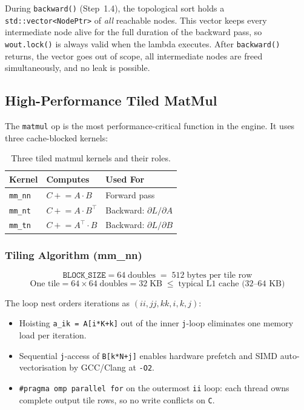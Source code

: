 \documentclass[12pt, a4paper]{article}
\begin{document}
\begin{tcolorbox}[interviewbox, title={Interview Talking Point - Why is weak\_ptr safe here?}]
  During \texttt{backward()} (Step~1.4), the topological sort holds a
  \texttt{std::vector<NodePtr>} of \emph{all} reachable nodes.  This vector
  keeps every intermediate node alive for the full duration of the backward
  pass, so \texttt{wout.lock()} is always valid when the lambda executes.
  After \texttt{backward()} returns, the vector goes out of scope, all
  intermediate nodes are freed simultaneously, and no leak is possible.
\end{tcolorbox}

\subsection{High-Performance Tiled MatMul}

The \texttt{matmul} op is the most performance-critical function in the engine.
It uses three cache-blocked kernels:

\begin{table}[!ht]
\centering
\renewcommand{\arraystretch}{1.35}
\begin{tabularx}{\textwidth}{@{} l l L @{}}
\toprule
\textbf{Kernel} & \textbf{Computes} & \textbf{Used For} \\
\midrule
\texttt{mm\_nn} & \(C \mathrel{+}= A \cdot B\)          & Forward pass \\
\texttt{mm\_nt} & \(C \mathrel{+}= A \cdot B^{\top}\)   & Backward: \(\partial L / \partial A\) \\
\texttt{mm\_tn} & \(C \mathrel{+}= A^{\top} \cdot B\)   & Backward: \(\partial L / \partial B\) \\
\bottomrule
\end{tabularx}
\caption{Three tiled matmul kernels and their roles.}
\end{table}

\subsubsection{Tiling Algorithm (mm\_nn)}

\[
  \texttt{BLOCK\_SIZE} = 64 \;\text{doubles} \;=\; 512\;\text{bytes per tile row}
\]
\[
  \text{One tile} = 64 \times 64 \;\text{doubles} = 32\;\text{KB}
  \;\leq\; \text{typical L1 cache (32--64 KB)}
\]

The loop nest orders iterations as \((ii, jj, kk, i, k, j)\):

\begin{itemize}
  \item Hoisting \texttt{a\_ik = A[i*K+k]} out of the inner \texttt{j}-loop
        eliminates one memory load per iteration.
  \item Sequential \texttt{j}-access of \texttt{B[k*N+j]} enables hardware
        prefetch and SIMD auto-vectorisation by GCC/Clang at \texttt{-O2}.
  \item \texttt{\#pragma omp parallel for} on the outermost \texttt{ii} loop:
        each thread owns complete output tile rows, so no write conflicts on
        \texttt{C}.
\end{itemize}
\end{document}
